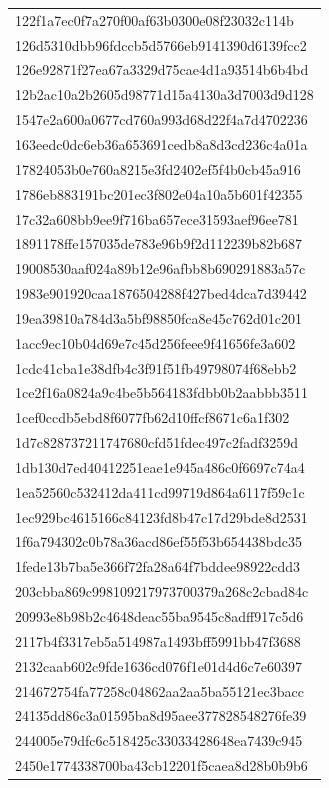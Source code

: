 \begin{tabular}{l}
122f1a7ec0f7a270f00af63b0300e08f23032c114b \\
126d5310dbb96fdccb5d5766eb9141390d6139fcc2 \\
126e92871f27ea67a3329d75cae4d1a93514b6b4bd \\
12b2ac10a2b2605d98771d15a4130a3d7003d9d128 \\
1547e2a600a0677cd760a993d68d22f4a7d4702236 \\
163eedc0dc6eb36a653691cedb8a8d3cd236c4a01a \\
17824053b0e760a8215e3fd2402ef5f4b0cb45a916 \\
1786eb883191bc201ec3f802e04a10a5b601f42355 \\
17c32a608bb9ee9f716ba657ece31593aef96ee781 \\
1891178ffe157035de783e96b9f2d112239b82b687 \\
19008530aaf024a89b12e96afbb8b690291883a57c \\
1983e901920caa1876504288f427bed4dca7d39442 \\
19ea39810a784d3a5bf98850fca8e45c762d01c201 \\
1acc9ec10b04d69e7c45d256feee9f41656fe3a602 \\
1cdc41cba1e38dfb4c3f91f51fb49798074f68ebb2 \\
1ce2f16a0824a9c4be5b564183fdbb0b2aabbb3511 \\
1cef0ccdb5ebd8f6077fb62d10ffcf8671c6a1f302 \\
1d7c828737211747680cfd51fdec497c2fadf3259d \\
1db130d7ed40412251eae1e945a486c0f6697c74a4 \\
1ea52560c532412da411cd99719d864a6117f59c1c \\
1ec929bc4615166c84123fd8b47c17d29bde8d2531 \\
1f6a794302c0b78a36acd86ef55f53b654438bdc35 \\
1fede13b7ba5e366f72fa28a64f7bddee98922cdd3 \\
203cbba869c998109217973700379a268c2cbad84c \\
20993e8b98b2c4648deac55ba9545c8adff917c5d6 \\
2117b4f3317eb5a514987a1493bff5991bb47f3688 \\
2132caab602c9fde1636cd076f1e01d4d6c7e60397 \\
214672754fa77258c04862aa2aa5ba55121ec3bacc \\
24135dd86c3a01595ba8d95aee377828548276fe39 \\
244005e79dfc6c518425c33033428648ea7439c945 \\
2450e1774338700ba43cb12201f5caea8d28b0b9b6 \\

\end{tabular}
